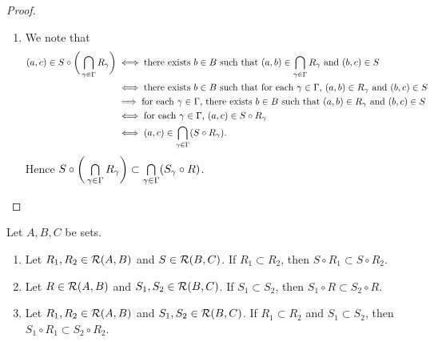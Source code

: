 \begin{proof}
\begin{enumerate}
\begin{enumerate}
\begin{align*}
				& \iff \text{there exists $b \in B$ and $\gam_0 \in \Gam$ such that $(a,b) \in R_{\gam_0}$ and $(b,c) \in S$} \\
				& \iff \text{there exists $\gam_0 \in \Gam$ such that $(a, c) \in S \circ R_{\gam_0}$} \\
				& \iff (a, c) \in \bigcup\limits_{\gam \in \Gam} (S \circ R_{\gam}).
			\end{align*}
			Hence $S \circ \bigg( \bigcup\limits_{\gam \in \Gam} R_{\gam} \bigg)  = \bigcup\limits_{\gam \in \Gam} (S_{\gam} \circ R)$.
			\item We note that  
			\begin{align*}
				(a,c) \in S \circ \bigg( \bigcap\limits_{\gamma \in \Gamma} R_{\gamma} \bigg)
				& \iff \text{there exists $b \in B$ such that $(a,b) \in \bigcap\limits_{\gamma \in \Gamma} R_{\gamma}$ and $(b,c) \in S$} \\
				& \iff \text{there exists $b \in B$ such that for each $\gamma \in \Gamma$, $(a,b) \in R_{\gamma}$ and $(b,c) \in S$} \\
				& \implies \text{for each $\gamma \in \Gamma$, there exists $b \in B$ such that $(a, b) \in  R_{\gamma}$ and $(b,c) \in S$} \\
				& \iff \text{for each $\gamma \in \Gamma$, $(a, c) \in S \circ R_{\gamma}$} \\
				& \iff (a, c) \in \bigcap\limits_{\gamma \in \Gamma} (S \circ R_{\gamma}).
			\end{align*}
			Hence $S \circ \bigg( \bigcap\limits_{\gamma \in \Gamma} R_{\gamma} \bigg) \subset \bigcap\limits_{\gamma \in \Gamma} (S_{\gamma} \circ R)$.
		\end{enumerate}
	\end{enumerate}
\end{proof}

\begin{ex}
	Let $A, B, C$ be sets. 
	\begin{enumerate}
		\item Let $R_1, R_2 \in \mathcal{R}(A, B)$ and $S \in \mathcal{R}(B,C)$. If $R_1 \subset R_2$, then $S \circ R_1 \subset S \circ R_2$. 
		\item Let $R \in \mathcal{R}(A, B)$ and $S_1, S_2 \in \mathcal{R}(B,C)$. If $S_1 \subset S_2$, then $S_1 \circ R \subset S_2 \circ R$. 
		\item Let $R_1, R_2 \in \mathcal{R}(A, B)$ and $S_1, S_2 \in \mathcal{R}(B,C)$. If $R_1 \subset R_2$ and $S_1 \subset S_2$, then $S_1 \circ R_1 \subset S_2 \circ R_2$.
	\end{enumerate}
\end{ex}

